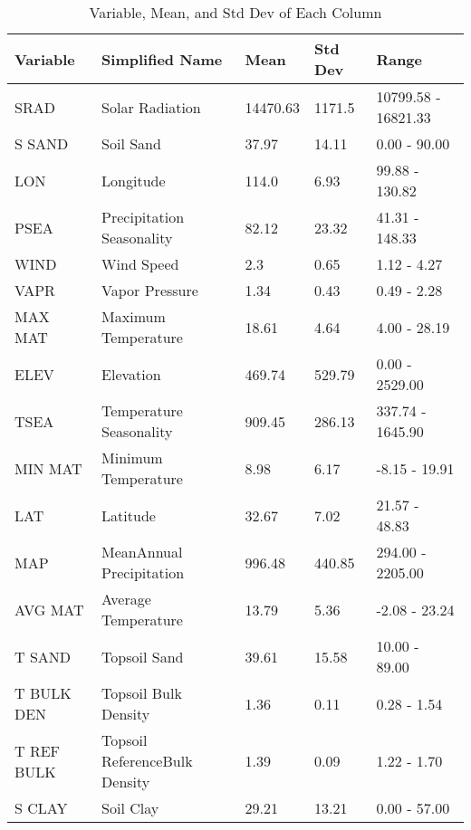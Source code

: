 \begin{table}
\caption{Variable, Mean, and Std Dev of Each Column}
\label{tab:range}
\begin{tabular}{lllll}
\toprule
Variable & Simplified Name & Mean & Std Dev & Range \\
\midrule
SRAD & Solar Radiation & 14470.63 & 1171.5 & 10799.58 - 16821.33 \\
S SAND & Soil Sand & 37.97 & 14.11 & 0.00 - 90.00 \\
LON & Longitude & 114.0 & 6.93 & 99.88 - 130.82 \\
PSEA & Precipitation Seasonality & 82.12 & 23.32 & 41.31 - 148.33 \\
WIND & Wind Speed & 2.3 & 0.65 & 1.12 - 4.27 \\
VAPR & Vapor Pressure & 1.34 & 0.43 & 0.49 - 2.28 \\
MAX MAT & Maximum Temperature & 18.61 & 4.64 & 4.00 - 28.19 \\
ELEV & Elevation & 469.74 & 529.79 & 0.00 - 2529.00 \\
TSEA & Temperature Seasonality & 909.45 & 286.13 & 337.74 - 1645.90 \\
MIN MAT & Minimum Temperature & 8.98 & 6.17 & -8.15 - 19.91 \\
LAT & Latitude & 32.67 & 7.02 & 21.57 - 48.83 \\
MAP & MeanAnnual Precipitation & 996.48 & 440.85 & 294.00 - 2205.00 \\
AVG MAT & Average Temperature & 13.79 & 5.36 & -2.08 - 23.24 \\
T SAND & Topsoil Sand & 39.61 & 15.58 & 10.00 - 89.00 \\
T BULK DEN & Topsoil Bulk Density & 1.36 & 0.11 & 0.28 - 1.54 \\
T REF BULK & Topsoil ReferenceBulk Density & 1.39 & 0.09 & 1.22 - 1.70 \\
S CLAY & Soil Clay & 29.21 & 13.21 & 0.00 - 57.00 \\
\bottomrule
\end{tabular}
\end{table}
